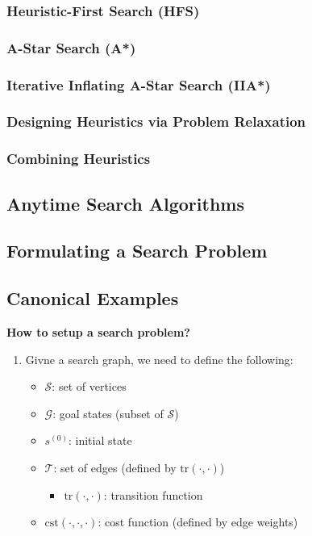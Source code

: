 \subsubsection{Heuristic-First Search (HFS)}

\subsubsection{A-Star Search (A*)}

\subsubsection{Iterative Inflating A-Star Search (IIA*)}

\subsubsection{Designing Heuristics via Problem Relaxation}

\subsubsection{Combining Heuristics}

\subsection{Anytime Search Algorithms}

\subsection{Formulating a Search Problem}
\newpage

\subsection{Canonical Examples}
\begin{process} \textbf{How to setup a search problem?}
    \begin{enumerate}
        \item Givne a search graph, we need to define the following:
        \begin{itemize}
            \item $\mathcal{S}$: set of vertices
            \item $\mathcal{G}$: goal states (subset of $\mathcal{S}$)
            \item $s^{(0)}$: initial state
            \item $\mathcal{T}$: set of edges (defined by $\text{tr}(\cdot, \cdot)$)
            \begin{itemize}
                \item $\text{tr}(\cdot, \cdot)$: transition function
            \end{itemize}
            \item $\text{cst}(\cdot, \cdot, \cdot)$: cost function (defined by edge weights)
        \end{itemize}
    \end{enumerate}
\end{process}

